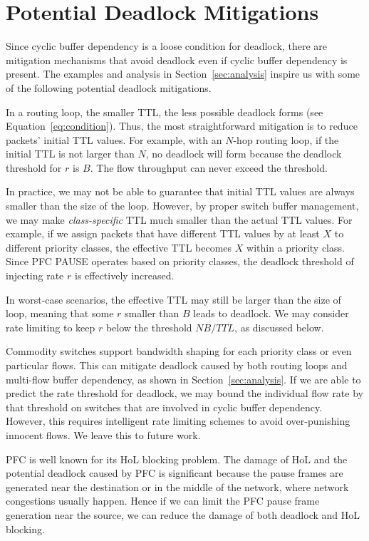 \secspace
\section{Potential Deadlock Mitigations}
\label{sec:mitigation}
\secspace

Since cyclic buffer dependency is a loose condition for deadlock, there are
mitigation mechanisms that avoid deadlock even if cyclic buffer dependency is present.
The examples and analysis in Section~\ref{sec:analysis}
inspire us with some of the following potential deadlock mitigations.


 In a routing loop, 
the smaller TTL, the less possible deadlock forms (see Equation~\ref{eq:condition}).
Thus, the most straightforward mitigation is to reduce packets' initial TTL values.
For example, with an $N$-hop routing loop, if the initial TTL is not larger than $N$,
no deadlock will form because the deadlock threshold for $r$ is $B$. The flow throughput
can never exceed the threshold.

In practice, we may not be able to guarantee that initial TTL values are always smaller than
the size of the loop. However, by proper switch buffer management, we may make {\em class-specific}
TTL much smaller than the actual TTL values. For example, if we assign packets 
that have different TTL values by at least $X$ to different priority classes, the effective TTL becomes $X$
within a priority class. Since PFC PAUSE operates based on priority classes, the deadlock threshold
of injecting rate $r$ is effectively increased.

In worst-case scenarios, the effective TTL may still be larger than the size of loop, meaning
that some $r$ smaller than $B$ leads to deadlock. We may consider rate limiting to keep
$r$ below the threshold $NB/TTL$, as discussed below.

 Commodity switches support bandwidth shaping for each priority class
or even particular flows. This can mitigate deadlock caused by both routing loops and multi-flow
buffer dependency, as shown in Section~\ref{sec:analysis}. If we are able to predict the rate 
threshold for deadlock, we may bound the individual flow rate by that threshold on switches 
that are involved in cyclic buffer dependency. However, this requires intelligent rate
limiting schemes to avoid over-punishing innocent flows. We leave this to future work.


PFC is well known for its HoL blocking problem. The damage of HoL and the potential deadlock caused 
by PFC is significant because the pause frames are generated near the destination or in the middle of 
the network, where network congestions usually happen. Hence if we can limit the PFC pause frame 
generation near the source, we can reduce the damage of both deadlock and HoL blocking. 

